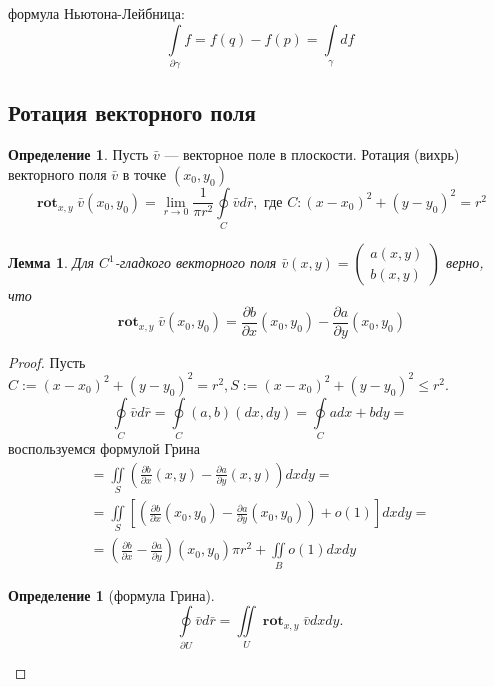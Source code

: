 \documentclass[a5paper]{article}
\newcounter{through}
\theoremstyle{plain}
\newtheorem{lemma}[through]{Лемма}
\theoremstyle{definition}
\newtheorem{definition}[through]{Определение}
\numberwithin{through}{section}
\numberwithin{equation}{section}
\DeclareMathOperator{\rot}{\textbf{rot}}
\begin{document}
формула Ньютона-Лейбница:
\[\int\limits_{\partial \gamma} f = f(q) - f(p) = \int\limits_{\gamma} df \]


\subsection{Ротация векторного поля}
\begin{definition}
	Пусть $\bar{v}$ --- векторное поле в плоскости. 
	Ротация (вихрь) векторного поля $\bar{v}$ в точке $(x_0, y_0)$ 
	\[\rot_{x, y} \bar{v} (x_0, y_0) = 
	\lim\limits_{r \to 0} \frac{1}{\pi r^{2}}\oint\limits_{C} \bar{v}d\bar{r}, \text{ где } C: (x-x_0)^2 + (y - y_0)^2 = r^2 \]
\end{definition}
\begin{lemma}
	Для $C^1$-гладкого векторного поля $\bar{v}(x,y) = 
	\begin{pmatrix}
	a(x,y) \\
	b(x,y)
	\end{pmatrix}$ верно, что 
	\begin{equation*}
		\rot_{x, y} \bar{v}(x_0, y_0) = \frac{\partial b}{\partial x}(x_0, y_0) - \frac{\partial a}{\partial y}(x_0, y_0)
	\end{equation*} 
\end{lemma}
\begin{proof}
	Пусть $C := (x-x_0)^2 + (y - y_0)^2 = r^2, S:=(x-x_0)^2 + (y - y_0)^2 \leq r^2 $. 
	\begin{equation*}
	\oint\limits_C \bar{v}d\bar{r} = \oint\limits_C (a, b)(dx, dy) = \oint\limits_C adx + bdy = 
	\end{equation*}
	воспользуемся формулой Грина
	\begin{eqnarray}
	= \iint\limits_S \left( \frac{\partial b}{\partial x}(x, y) - \frac{\partial a}{\partial y}(x, y) \right)dxdy = \nonumber\\
	= \iint\limits_S \left[ \left( \frac{\partial b}{\partial x}(x_0, y_0) - \frac{\partial a}{\partial y}(x_0, y_0) \right) + o(1) \right]
	dxdy = \nonumber \\
	= \left( \frac{\partial b}{\partial x} - \frac{\partial a}{\partial y} \right)(x_0, y_0) \pi r^2 + \iint\limits_B o(1)dxdy
	\nonumber
	\end{eqnarray}  
	
	\begin{definition}[формула Грина]
		\begin{equation*}
		\oint\limits_{\partial U} \bar{v} d\bar{r} = \iint\limits_U \rot_{x,y} \bar{v} dxdy.
		\end{equation*}
	\end{definition}
\end{proof}
\end{document}
